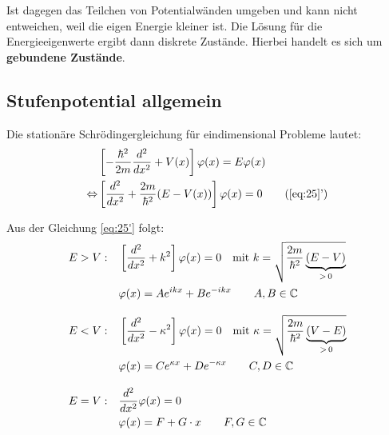 Ist dagegen das Teilchen von Potentialwänden umgeben und kann nicht entweichen, weil die eigen Energie kleiner ist. Die Lösung für die Energieeigenwerte ergibt dann diskrete Zustände. Hierbei handelt es sich um \textbf{gebundene Zustände}.

\subsection{Stufenpotential allgemein}

Die stationäre Schrödingergleichung für eindimensional Probleme lautet:
\begin{align} 
  &\left[-\frac{\hbar^2}{2m}\frac{d^2}{dx^2}+V(x)\right]\varphi(x)
  =E\varphi(x)\label{eq:25}\\
  \Leftrightarrow &\left[\frac{d^2}{dx^2} 
    +\frac{2m}{\hbar^2}(E-V(x))\right]\varphi(x)=0 
  \tag{\ref{eq:25}'}\label{eq:25'} 
\end{align}

Aus der Gleichung \eqref{eq:25'} folgt:
\begin{subequations}
  \label{eq:27}
  \begin{align}
    E>V: \quad &\left[\frac{d^2}{dx^2}+k^2\right]\varphi(x)=0 
    \quad \textrm{mit } k=\sqrt{\frac{2m}{\hbar^2}\underbrace{(E-V)}_{>\,0}} \notag \\
    &\varphi(x)=Ae^{ikx}+Be^{-ikx}  
    \qquad  A,B \in \mathbb{C} \label{eq:27a} \\[2ex]
    E<V: \quad &\left[\frac{d^2}{dx^2}-\kappa^2\right]\varphi(x)=0
    \quad  \textrm{mit } \kappa=\sqrt{\frac{2m}{\hbar^2}\underbrace{(V-E)}_{>\,0}} \notag \\
    &\varphi(x)=Ce^{\kappa x}+De^{-\kappa x}  
    \qquad  C,D \in \mathbb{C} \label{eq:27b}\\[2ex]
    E=V: \quad &\frac{d^2}{dx^2}\varphi(x)=0 \notag \\
    &\varphi(x)=F+G\cdot x   
    \qquad  F,G \in \mathbb{C} \label{eq:27c}
  \end{align}
\end{subequations}

